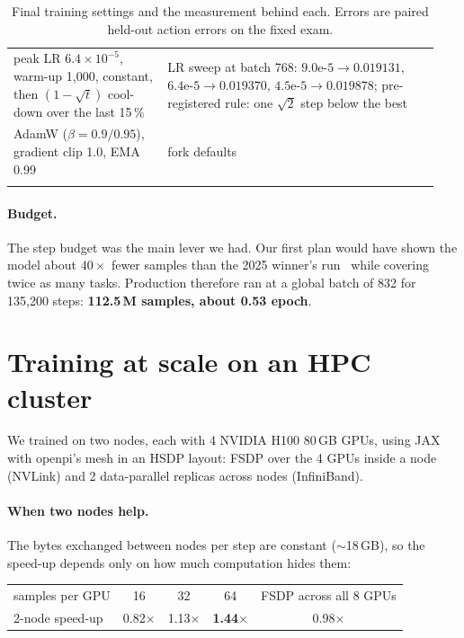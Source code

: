 \documentclass[10pt]{article}
\begin{document}
\begin{table}[t]
\begin{tabular}{@{}>{\raggedright\arraybackslash}p{0.34\linewidth}>{\raggedright\arraybackslash}p{0.6\linewidth}@{}}
\arrayrulecolor{black!25}\midrule
peak LR $6.4\times10^{-5}$, warm-up 1{,}000, constant, then $(1-\sqrt{t})$ cool-down over the last 15\,\% & LR sweep at batch 768: $9.0\text{e-}5 \to 0.019131$, $6.4\text{e-}5 \to 0.019370$, $4.5\text{e-}5 \to 0.019878$; pre-registered rule: one $\sqrt2$ step below the best \\
\arrayrulecolor{black!25}\midrule
AdamW ($\beta = 0.9/0.95$), gradient clip 1.0, EMA 0.99 & fork defaults \\
\arrayrulecolor{black}
\bottomrule
\end{tabular}
\caption{Final training settings and the measurement behind each. Errors are paired held-out action errors on the fixed exam.}
\label{tab:recipe}
\end{table}

\paragraph{Budget.} The step budget was the main lever we had. Our first plan would have shown the model about
$40\times$ fewer samples than the 2025 winner's run~\cite{rlc2025} while covering twice as many tasks. Production
therefore ran at a global batch of 832 for 135{,}200 steps: \textbf{112.5\,M samples, about 0.53 epoch}.

\section{Training at scale on an HPC cluster}
\label{sec:scale}
We trained on two nodes, each with 4 NVIDIA H100 80\,GB GPUs, using JAX with openpi's
mesh in an HSDP layout: FSDP over the 4 GPUs inside a node (NVLink) and 2 data-parallel replicas across nodes
(InfiniBand).

\paragraph{When two nodes help.} The bytes exchanged between nodes per step are constant ($\sim$18\,GB), so the
speed-up depends only on how much computation hides them:

\begin{center}\small
\begin{tabular}{@{}lcccc@{}}
\toprule
samples per GPU & 16 & 32 & 64 & FSDP across all 8 GPUs \\
2-node speed-up & 0.82$\times$ & 1.13$\times$ & \textbf{1.44}$\times$ & 0.98$\times$ \\
\bottomrule
\end{tabular}
\end{center}
\end{document}
